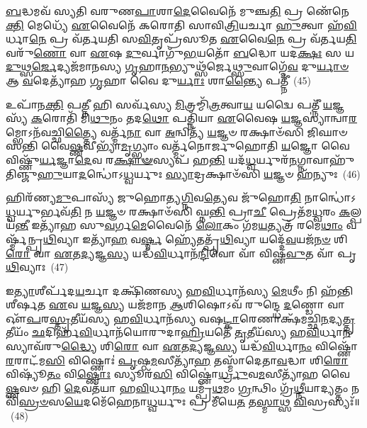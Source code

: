 {\anuvakamend[{\-\ul{𑌵𑌿}\-𑌤𑍍𑌤𑍍𑌵𑌾 𑌦𑍇᳴𑌵\-\ul{𑌯}\-𑌤 \ul{𑌏}\-𑌷𑌾𑌮᳴𑌬𑍍𑌰𑍁\-\ul{𑌵}\-𑌨𑍍 𑌯𑌾\-\ul{𑌨𑌿} 𑌚𑌤𑍁᳴𑌶𑍍𑌚𑌤𑍍𑌵𑌾𑌰𑌿𑍞𑌶𑌚𑍍𑌚}]}%

\-\ul{𑌬}\-𑌦𑍍𑌧𑌮𑌵᳴ 𑌸𑍍𑌯𑌤𑌿 𑌵𑌰𑍁𑌣\-\ul{𑌪𑌾}\-𑌶𑌾\-\ul{𑌦𑍇}\-𑌵𑍈𑌨𑍇᳴ 𑌮𑍁𑌞𑍍𑌚\-\ul{𑌤𑌿} 𑌪𑍍𑌰 𑌣𑍇᳴𑌨𑍇\-\ul{𑌕𑍍𑌤𑌿} 𑌮𑍇𑌧𑍍𑌯𑍇᳴ \ul{𑌏}\-𑌵𑍈𑌨𑍇᳴ 𑌕𑌰𑍋𑌤𑌿 𑌸𑌾𑌵𑌿\-\ul{𑌤𑍍𑌰𑌿}\-𑌯𑌰𑍍𑌚𑌾 \ul{𑌹𑍁}\-𑌤𑍍𑌵𑌾 𑌹᳴\-\ul{𑌵𑌿}\-𑌰𑍍𑌧𑌾\-\ul{𑌨𑍇} 𑌪𑍍𑌰 𑌵᳴𑌰𑍍𑌤𑌯𑌤𑌿 𑌸\-\ul{𑌵𑌿}\-𑌤𑍃𑌪𑍍𑌰᳴𑌸𑍂𑌤 \ul{𑌏}\-𑌵𑍈\-\ul{𑌨𑍇} 𑌪𑍍𑌰 𑌵᳴𑌰𑍍𑌤𑌯\-\ul{𑌤𑌿} 𑌵𑌰𑍁᳴\-\ul{𑌣𑍋} 𑌵𑌾 \ul{𑌏}\-𑌷 \ul{𑌦𑍁}\-𑌰𑍍𑌵𑌾𑌗𑍁᳴\-\ul{𑌭}\-𑌯𑌤𑍋᳴ \ul{𑌬}\-𑌦𑍍𑌧𑍋 𑌯𑌦\-\ul{𑌕𑍍𑌷𑌃} 𑌸 𑌯\-\ul{𑌦𑍁}\-𑌥𑍍𑌸\-\ul{𑌰𑍍𑌜𑍇}\-𑌦𑍍𑌯𑌜᳴𑌮𑌾𑌨𑌸𑍍𑌯 \ul{𑌗𑍃}\-𑌹𑌾\-\ul{𑌨}\-𑌭𑍍𑌯𑍁𑌥𑍍𑌸᳴𑌰𑍍𑌜𑍇\-\ul{𑌥𑍍𑌸𑍁}\-𑌵𑌾𑌗𑍍𑌦𑍇᳴\-\ul{𑌵} 𑌦𑍁\-\ul{𑌰𑍍𑌯𑌾}\-\-\ul{𑍞} 𑌆 \ul{𑌵}\-𑌦𑍇𑌤𑍍𑌯𑌾᳴𑌹 \ul{𑌗𑍃}\-𑌹𑌾 𑌵𑍈 𑌦𑍁\-\ul{𑌰𑍍𑌯𑌾𑌃} 𑌶𑌾\-\ul{𑌨𑍍𑌤𑍍𑌯𑍈} 𑌪𑌤𑍍𑌨𑍀॑~(45)

𑌉𑌪𑌾᳴𑌨\-\ul{𑌕𑍍𑌤𑌿} 𑌪\-\ul{𑌤𑍍𑌨𑍀} 𑌹𑌿 𑌸𑌰𑍍𑌵᳴𑌸𑍍𑌯 \ul{𑌮𑌿}\-𑌤𑍍𑌰𑌮𑍍𑌮𑌿᳴\-\ul{𑌤𑍍𑌰}\-𑌤𑍍𑌵𑌾\-\ul{𑌯} 𑌯𑌦𑍍𑌵𑍈 𑌪𑌤𑍍𑌨𑍀᳴ \ul{𑌯}\-𑌜𑍍𑌞𑌸𑍍𑌯᳴ \ul{𑌕}\-𑌰𑍋𑌤𑌿᳴ 𑌮𑌿\-\ul{𑌥𑍁}\-𑌨𑌂 𑌤𑌦\-\ul{𑌥𑍋} 𑌪𑌤𑍍𑌨𑌿᳴𑌯𑌾 \ul{𑌏}\-𑌵𑍈𑌷 \ul{𑌯}\-𑌜𑍍𑌞𑌸𑍍𑌯𑌾॑𑌨𑍍𑌵𑌾\-\ul{𑌰}\-𑌮𑍍𑌭𑍋\-𑌽𑌨᳴𑌵𑌚𑍍𑌛𑌿\-\ul{𑌤𑍍𑌤𑍍𑌯𑍈} 𑌵𑌰𑍍𑌤𑍍𑌮᳴\-\ul{𑌨𑌾} 𑌵𑌾 \ul{𑌅}\-𑌨𑍍𑌵𑌿𑌤𑍍𑌯᳴ \ul{𑌯}\-𑌜𑍍𑌞𑍞 𑌰𑌕𑍍𑌷𑌾𑍞᳴𑌸𑌿 𑌜𑌿𑌘𑌾𑍞𑌸𑌨𑍍𑌤𑌿 𑌵𑍈\-\ul{𑌷𑍍𑌣}\-𑌵𑍀𑌭𑍍𑌯𑌾᳴\-\ul{𑌮𑍃}\-𑌗𑍍𑌭𑍍𑌯𑌾𑌂 𑌵𑌰𑍍𑌤𑍍𑌮᳴𑌨𑍋𑌰𑍍𑌜𑍁𑌹𑍋𑌤𑌿 \ul{𑌯}\-𑌜𑍍𑌞𑍋 𑌵𑍈 𑌵𑌿𑌷𑍍𑌣𑍁᳴\-\ul{𑌰𑍍𑌯}\-𑌜𑍍𑌞𑌾\-\ul{𑌦𑍇}\-𑌵 𑌰\-\ul{𑌕𑍍𑌷𑌾}\-\-\ul{𑍟}\-𑌸𑍍𑌯𑌪᳴ 𑌹\-\ul{𑌨𑍍𑌤𑌿} 𑌯𑌦᳴\-\ul{𑌧𑍍𑌵}\-𑌰𑍍𑌯𑍁𑌰᳴\-\ul{𑌨}\-𑌗𑍍𑌨𑌾𑌵𑌾𑌹𑍁᳴𑌤𑌿𑌞𑍍𑌜𑍁\-\ul{𑌹𑍁}\-𑌯𑌾\-\ul{𑌦}\-𑌨𑍍𑌧𑍋॑\-𑌽\-\ul{𑌧𑍍𑌵}\-𑌰𑍍𑌯𑍁𑌃 \ul{𑌸𑍍𑌯𑌾}\-𑌦𑍍𑌰𑌕𑍍𑌷𑌾𑍞᳴𑌸𑌿 \ul{𑌯}\-𑌜𑍍𑌞𑍞 𑌹᳴𑌨𑍍𑌯𑍁𑌃~(46)

𑌹𑌿𑌰᳴𑌣𑍍𑌯\-\ul{𑌮𑍁}\-𑌪𑌾𑌸𑍍𑌯᳴ 𑌜𑍁𑌹𑍋𑌤𑍍𑌯\-\ul{𑌗𑍍𑌨𑌿}\-𑌵\-\ul{𑌤𑍍𑌯𑍇}\-𑌵 𑌜𑍁᳴𑌹𑍋\-\ul{𑌤𑌿} 𑌨𑌾𑌨𑍍𑌧𑍋॑\-𑌽\-\ul{𑌧𑍍𑌵}\-𑌰𑍍𑌯𑍁𑌰𑍍𑌭𑌵᳴\-\ul{𑌤𑌿} 𑌨 \ul{𑌯}\-𑌜𑍍𑌞𑍞 𑌰𑌕𑍍𑌷𑌾𑍞᳴𑌸𑌿 𑌘𑍍𑌨\-\ul{𑌨𑍍𑌤𑌿} 𑌪𑍍𑌰𑌾\-\ul{𑌚𑍀} 𑌪𑍍𑌰𑍇𑌤᳴𑌮\-\ul{𑌧𑍍𑌵}\-𑌰𑌂 \ul{𑌕}\-𑌲𑍍𑌪𑌯᳴\-\ul{𑌨𑍍𑌤𑍀} 𑌇𑌤𑍍𑌯𑌾᳴𑌹 𑌸𑍁\-\ul{𑌵}\-𑌰𑍍𑌗\-\ul{𑌮𑍇}\-𑌵𑍈𑌨𑍇᳴ \ul{𑌲𑍋}\-𑌕𑌂 𑌗᳴𑌮\-\ul{𑌯}\-𑌤𑍍𑌯𑌤𑍍𑌰᳴ 𑌰𑌮𑍇\-\ul{𑌥𑌾𑌂} 𑌵𑌰𑍍𑌷𑍍𑌮᳴𑌨𑍍𑌪𑍃\-\ul{𑌥𑌿}\-𑌵𑍍𑌯𑌾 𑌇𑌤𑍍𑌯𑌾᳴\-\ul{𑌹} 𑌵\-\ul{𑌰𑍍𑌷𑍍𑌮} 𑌹𑍍𑌯𑍇᳴𑌤𑌤𑍍𑌪𑍃᳴\-\ul{𑌥𑌿}\-𑌵𑍍𑌯𑌾 𑌯𑌦𑍍𑌦𑍇᳴\-\ul{𑌵}\-𑌯𑌜᳴\-\ul{𑌨}\-\-\ul{𑍞} 𑌶𑌿\-\ul{𑌰𑍋} 𑌵𑌾 \ul{𑌏}\-𑌤\-\ul{𑌦𑍍𑌯}\-𑌜𑍍𑌞\-\ul{𑌸𑍍𑌯} 𑌯𑌦𑍍𑌧᳴\-\ul{𑌵𑌿}\-𑌰𑍍𑌧𑌾𑌨᳴\-\ul{𑌨𑍍𑌦𑌿}\-𑌵𑍋 𑌵𑌾᳴ 𑌵𑌿𑌷𑍍𑌣\-\ul{𑌵𑍁}\-𑌤 𑌵𑌾᳴ 𑌪𑍃\-\ul{𑌥𑌿}\-𑌵𑍍𑌯𑌾𑌃~(47)

𑌇\-\ul{𑌤𑍍𑌯𑌾}\-𑌶𑍀𑌰𑍍𑌪᳴𑌦\-\ul{𑌯}\-𑌰𑍍𑌚𑌾 𑌦𑌕𑍍𑌷𑌿᳴𑌣𑌸𑍍𑌯 𑌹\-\ul{𑌵𑌿}\-𑌰𑍍𑌧𑌾𑌨᳴𑌸𑍍𑌯 \ul{𑌮𑍇}\-𑌥𑍀𑌂 𑌨𑌿 𑌹᳴𑌨𑍍𑌤𑌿 𑌶𑍀𑌰𑍍\mbox{}\-\ul{𑌷}\-𑌤 \ul{𑌏}\-𑌵 \ul{𑌯}\-𑌜𑍍𑌞\-\ul{𑌸𑍍𑌯} 𑌯𑌜᳴𑌮𑌾𑌨 \ul{𑌆}\-𑌶𑌿𑌷𑍋\-𑌽𑌵᳴ 𑌰𑍁𑌨𑍍𑌦𑍍𑌧𑍇 \ul{𑌦}\-𑌣𑍍𑌡𑍋 𑌵𑌾 𑌔᳴\-\ul{𑌪}\-𑌰\-\ul{𑌸𑍍𑌤𑍃}\-𑌤𑍀𑌯᳴𑌸𑍍𑌯 𑌹\-\ul{𑌵𑌿}\-𑌰𑍍𑌧𑌾𑌨᳴𑌸𑍍𑌯 𑌵𑌷\-\ul{𑌟𑍍𑌕𑌾}\-𑌰𑍇𑌣𑌾𑌕𑍍𑌷᳴𑌮𑌚𑍍𑌛𑌿\-\ul{𑌨}\-𑌦𑍍𑌯\-\ul{𑌤𑍍𑌤𑍃}\-𑌤𑍀𑌯𑌂᳴ \ul{𑌛}\-𑌦𑌿𑌰𑍍\mbox{}𑌹᳴\-\ul{𑌵𑌿}\-𑌰𑍍𑌧𑌾𑌨᳴𑌯𑍋𑌰𑍁𑌦𑌾\-\ul{𑌹𑍍𑌰𑌿}\-𑌯𑌤𑍇᳴ \ul{𑌤𑍃}\-𑌤𑍀𑌯᳴𑌸𑍍𑌯 𑌹\-\ul{𑌵𑌿}\-𑌰𑍍𑌧𑌾\-\ul{𑌨}\-𑌸𑍍𑌯𑌾𑌵᳴𑌰𑍁\-\ul{𑌦𑍍𑌧𑍍𑌯𑍈} 𑌶𑌿\-\ul{𑌰𑍋} 𑌵𑌾 \ul{𑌏}\-𑌤\-\ul{𑌦𑍍𑌯}\-𑌜𑍍𑌞\-\ul{𑌸𑍍𑌯} 𑌯𑌦𑍍𑌧᳴\-\ul{𑌵𑌿}\-𑌰𑍍𑌧𑌾\-\ul{𑌨𑌂} 𑌵𑌿𑌷𑍍𑌣𑍋᳴ \ul{𑌰}\-𑌰𑌾𑌟᳴𑌮\-\ul{𑌸𑌿} 𑌵𑌿𑌷𑍍𑌣𑍋𑌃॑ \ul{𑌪𑍃}\-𑌷𑍍𑌠\-\ul{𑌮}\-𑌸𑍀𑌤𑍍𑌯𑌾᳴\-\ul{𑌹} 𑌤𑌸𑍍𑌮𑌾᳴𑌦𑍇𑌤𑌾\-\ul{𑌵}\-𑌦𑍍𑌧𑌾 𑌶𑌿\-\ul{𑌰𑍋} 𑌵𑌿𑌷𑍍𑌯𑍂᳴\-\ul{𑌤𑌂} 𑌵𑌿\-\ul{𑌷𑍍𑌣𑍋𑌃} 𑌸𑍍𑌯𑍂𑌰᳴\-\ul{𑌸𑌿} 𑌵𑌿𑌷𑍍𑌣𑍋॑\-\ul{𑌰𑍍𑌧𑍍𑌰𑍁}\-𑌵\-\ul{𑌮}\-𑌸𑍀𑌤𑍍𑌯𑌾᳴𑌹 𑌵𑍈\-\ul{𑌷𑍍𑌣}\-𑌵𑍞 𑌹𑌿 \ul{𑌦𑍇}\-𑌵𑌤᳴𑌯𑌾 𑌹\-\ul{𑌵𑌿}\-𑌰𑍍𑌧𑌾\-\ul{𑌨𑌂} 𑌯𑌮𑍍𑌪𑍍𑌰᳴\-\ul{𑌥}\-𑌮𑌂 \ul{𑌗𑍍𑌰}\-𑌨𑍍𑌥𑌿𑌂 𑌗𑍍𑌰᳴\-\ul{𑌥𑍍𑌨𑍀}\-𑌯𑌾𑌦𑍍𑌯𑌤𑍍𑌤𑌂 𑌨 𑌵𑌿᳴\-\ul{𑌸𑍍𑌰}\-\-\ul{𑍞}\-𑌸\-\ul{𑌯𑍇}\-𑌦𑌮𑍇᳴𑌹𑍇𑌨𑌾\-\ul{𑌧𑍍𑌵}\-𑌰𑍍𑌯𑍁𑌃 𑌪𑍍𑌰 𑌮𑍀᳴𑌯𑍇\-\ul{𑌤} 𑌤\-\ul{𑌸𑍍𑌮𑌾}\-𑌥𑍍𑌸 \ul{𑌵𑌿}\-𑌸𑍍𑌰𑌸𑍍𑌯𑌃᳴॥~(48)

